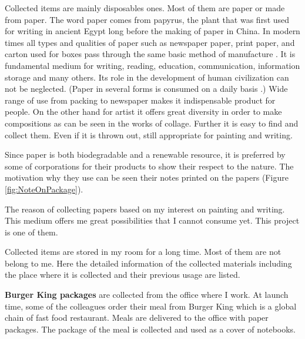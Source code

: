 Collected items are mainly disposables ones. Most of them are paper or made from paper. The word paper comes from papyrus, the plant that was first used for writing in ancient Egypt long before the making of paper in China. In modern times all types and qualities of paper such as newspaper paper, print paper, and carton used for boxes pass through the same basic method of manufacture \citep{trafford2012paper}. It is fundamental medium for writing, reading, education, communication, information storage and many others. Its role in the development of human civilization can not be neglected. (Paper in several forms is consumed on a daily basis \citep{trafford2012paper}.) Wide range of use from packing to newspaper makes it indispensable product for people. On the other hand for artist it offers great diversity in order to make compositions as can be seen in the works of collage. Further it is easy to find and collect them. Even if it is thrown out, still appropriate for painting and writing.

Since paper is both biodegradable and a renewable resource, it is preferred by some of corporations for their products to show their respect to the nature. The motivation why they use can be seen their notes printed on the papers (Figure \ref{fig:NoteOnPackage}).


The reason of collecting papers based on my interest on painting and writing. This medium offers me great possibilities that I cannot consume yet. This project is one of them.

Collected items are stored in my room for a long time. Most of them are not belong to me. Here the detailed information of the collected materials including the place where it is collected and their previous usage are listed.

\textbf{Burger King packages} are collected from the office where I work. At launch time, some of the colleagues order their meal from Burger King which is a global chain of fast food restaurant. Meals are delivered to the office with paper packages. The package of the meal is collected and used as a cover of notebooks. 

